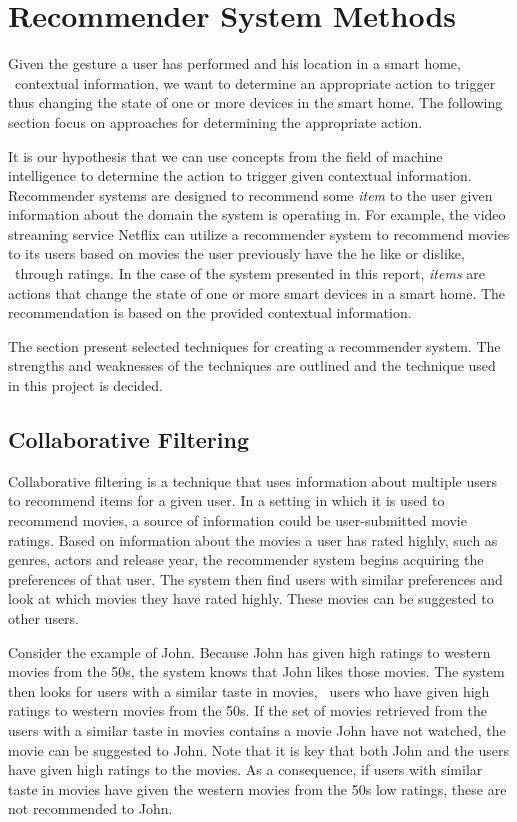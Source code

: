 \section{Recommender System Methods}
\label{sec:analysis:recommender-systems}

Given the gesture a user has performed and his location in a smart home, \ie~contextual information, we want to determine an appropriate action to trigger thus changing the state of one or more devices in the smart home. The following section focus on approaches for determining the appropriate action.

It is our hypothesis that we can use concepts from the field of machine intelligence to determine the action to trigger given contextual information. Recommender systems are designed to recommend some \emph{item} to the user given information about the domain the system is operating in. For example, the video streaming service Netflix can utilize a recommender system to recommend movies to its users based on movies the user previously have the he like or dislike, \eg~through ratings.
In the case of the system presented in this report, \emph{items} are actions that change the state of one or more smart devices in a smart home. The recommendation is based on the provided contextual information.

The section present selected techniques for creating a recommender system. The strengths and weaknesses of the techniques are outlined and the technique used in this project is decided.

\subsection{Collaborative Filtering}
\label{sec:analysis:recommender-methods:collaborative-filtering}

Collaborative filtering is a technique that uses information about multiple users to recommend items for a given user.
In a setting in which it is used to recommend movies, a source of information could be user-submitted movie ratings.
Based on information about the movies a user has rated highly, such as genres, actors and release year, the recommender system begins acquiring the preferences of that user.
The system then find users with similar preferences and look at which movies they have rated highly. These movies can be suggested to other users.

Consider the example of John. Because John has given high ratings to western movies from the 50s, the system knows that John likes those movies. The system then looks for users with a similar taste in movies, \ie~users who have given high ratings to western movies from the 50s. If the set of movies retrieved from the users with a similar taste in movies contains a movie John have not watched, the movie can be suggested to John. Note that it is key that both John and the users have given high ratings to the movies. As a consequence, if users with similar taste in movies have given the western movies from the 50s low ratings, these are not recommended to John.

